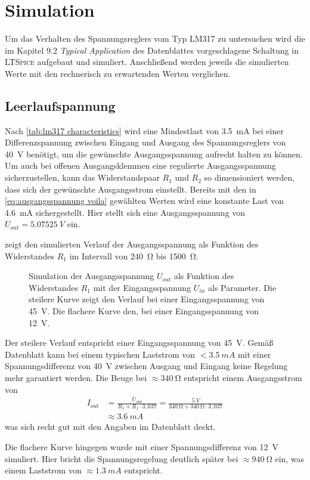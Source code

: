 \chapter{Simulation}
	Um das Verhalten des Spannungsreglers vom Typ LM317 zu untersuchen wird die im Kapitel 9.2 \textit{Typical Application} des Datenblattes
	vorgeschlagene Schaltung in \textsc{LTSpice} aufgebaut und simuliert. Anschließend werden jeweils die simulierten Werte mit den
	rechnerisch zu erwartenden Werten verglichen.
	\section{Leerlaufspannung}\label{sec:leerlaufspannung}
		Nach \cref{tab:lm317 characteristics} wird eine Mindestlast von \SI{3,5}{mA} bei einer Differenzspannung zwischen Eingang
		und Ausgang des Spannungsreglers von \SI{40}{V} benötigt, um die gewünschte Ausgangsspannung aufrecht halten zu können.
		Um auch bei offenen Ausgangsklemmen eine regulierte Ausgangsspannung sicherzustellen, kann das Widerstandspaar \(R_1\) und \(R_2\)
		so dimensioniert werden, dass sich der gewünschte Ausgangsstrom einstellt. Bereits mit den in \cref{eq:ausgangsspannung voila} gewählten
		Werten wird eine konstante Last von \SI{4,6}{mA} sichergestellt. Hier stellt sich eine Ausgangsspannung von \(U_{out} = \SI{5,07525}{V}\) ein.\par
		 zeigt den simulierten Verlauf der Ausgangsspannung als Funktion des Widerstandes \(R_1\) im Intervall
		von \SI{240}{\ohm} bis \SI{1500}{\ohm}.
		\begin{figure}[h]
			\centering
			
			\caption[Simulation der Ausgangsspannung im Leerlauf in Abhängigkeit von \(R_1\)]{Simulation der Ausgangsspannung \(U_{out}\) als Funktion des Widerstandes \(R_1\) mit der Eingangsspannung \(U_{in}\) als Parameter.
			Die steilere Kurve zeigt den Verlauf bei einer Eingangsspannung von \SI{45}{V}. Die flachere Kurve den, bei einer Eingangsspannung von \SI{12}{V}.}
			\label{fig:plot minimum load}
		\end{figure}
		Der steilere Verlauf entspricht einer Eingangsspannung von \SI{45}{V}. Gemäß Datenblatt kann bei einem typischen Laststrom von \(< \SI{3.5}{mA}\) mit einer Spannungsdifferenz von
		\SI{40}{V} zwischen Ausgang und Eingang keine Regelung mehr garantiert werden. Die Beuge bei \(\approx \SI{340}{\ohm}\) entspricht einem
		Ausgangsstrom von
		\begin{align}
			I_{out} &= \frac{U_{out}}{R_1 + R_1 \cdot 3,037} = \frac{\SI{5}{V}}{\SI{340}{\ohm} + \SI{340}{\ohm} \cdot 3,037} \nonumber \\
					&\approx \SI{3,6}{mA}
			\label{eq:ausgangsstrom bei 45V in und ohne last}
		\end{align}
		was sich recht gut mit den Angaben im Datenblatt deckt.\par
		Die flachere Kurve hingegen wurde mit einer Spannungsdifferenz von \SI{12}{V} simuliert. Hier bricht die Spannungsregelung
		deutlich später bei \(\approx \SI{940}{\ohm}\) ein, was einem Laststrom von \(\approx \SI{1,3}{mA}\) entspricht.
